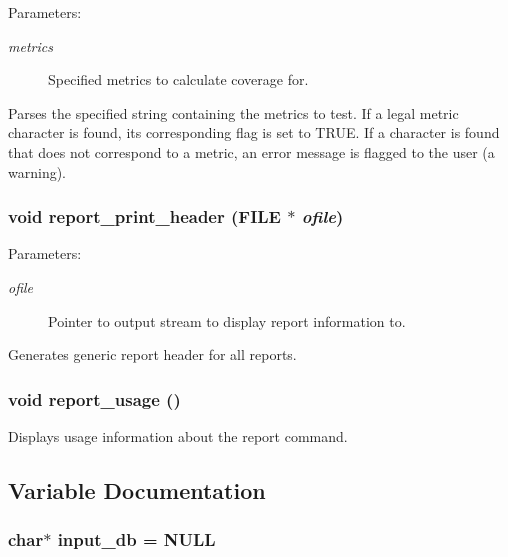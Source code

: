 \begin{Desc}
\item[Parameters: ]\par
\begin{description}
\item[{\em 
metrics}]Specified metrics to calculate coverage for.\end{description}
\end{Desc}
Parses the specified string containing the metrics to test. If a legal metric character is found, its corresponding flag is set to TRUE. If a character is found that does not correspond to a metric, an error message is flagged to the user (a warning). 
\subsubsection{\setlength{\rightskip}{0pt plus 5cm}void report\_\-print\_\-header (FILE $\ast$ {\em ofile})}\label{report_8c_a13}


\begin{Desc}
\item[Parameters: ]\par
\begin{description}
\item[{\em 
ofile}]Pointer to output stream to display report information to.\end{description}
\end{Desc}
Generates generic report header for all reports. 
\subsubsection{\setlength{\rightskip}{0pt plus 5cm}void report\_\-usage ()}\label{report_8c_a9}


Displays usage information about the report command. 

\subsection{Variable Documentation}
\subsubsection{\setlength{\rightskip}{0pt plus 5cm}char$\ast$ input\_\-db = NULL}\label{report_8c_a7}


